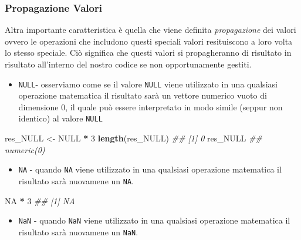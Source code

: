 \documentclass[
]{book}
\newenvironment{Shaded}{\begin{snugshade}}{\end{snugshade}}
\newcommand{\CommentTok}[1]{\textcolor[rgb]{0.56,0.35,0.01}{\textit{#1}}}
\newcommand{\DecValTok}[1]{\textcolor[rgb]{0.00,0.00,0.81}{#1}}
\newcommand{\KeywordTok}[1]{\textcolor[rgb]{0.13,0.29,0.53}{\textbf{#1}}}
\newcommand{\NormalTok}[1]{#1}
\newcommand{\OperatorTok}[1]{\textcolor[rgb]{0.81,0.36,0.00}{\textbf{#1}}}
\newcommand{\OtherTok}[1]{\textcolor[rgb]{0.56,0.35,0.01}{#1}}
\newcommand{\StringTok}[1]{\textcolor[rgb]{0.31,0.60,0.02}{#1}}
\providecommand{\tightlist}{%
  \setlength{\itemsep}{0pt}\setlength{\parskip}{0pt}}
\begin{document}
\hypertarget{propagazione-valori}{%
\subsubsection*{Propagazione Valori}\label{propagazione-valori}}

Altra importante caratteristica è quella che viene definita \emph{propagazione} dei valori ovvero le operazioni che includono questi speciali valori resituiscono a loro volta lo stesso speciale. Ciò significa che questi valori si propagheranno di risultato in risultato all'interno del nostro codice se non opportunamente gestiti.

\begin{itemize}
\tightlist
\item
  \texttt{NULL}- osserviamo come se il valore \texttt{NULL} viene utilizzato in una qualsiasi operazione matematica il risultato sarà un vettore numerico vuoto di dimensione 0, il quale può essere interpretato in modo simile (seppur non identico) al valore \texttt{NULL}
\end{itemize}

\begin{Shaded}
\begin{Highlighting}[]
\NormalTok{res_NULL <-}\StringTok{ }\OtherTok{NULL} \OperatorTok{*}\StringTok{ }\DecValTok{3}
\KeywordTok{length}\NormalTok{(res_NULL)}
\CommentTok{## [1] 0}
\NormalTok{res_NULL}
\CommentTok{## numeric(0)}
\end{Highlighting}
\end{Shaded}

\begin{itemize}
\tightlist
\item
  \texttt{NA} - quando \texttt{NA} viene utilizzato in una qualsiasi operazione matematica il risultato sarà nuovamene un \texttt{NA}.
\end{itemize}

\begin{Shaded}
\begin{Highlighting}[]
\OtherTok{NA} \OperatorTok{*}\StringTok{ }\DecValTok{3}
\CommentTok{## [1] NA}
\end{Highlighting}
\end{Shaded}

\begin{itemize}
\tightlist
\item
  \texttt{NaN} - quando \texttt{NaN} viene utilizzato in una qualsiasi operazione matematica il risultato sarà nuovamene un \texttt{NaN}.
\end{itemize}
\end{document}
